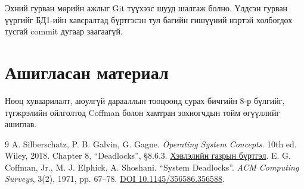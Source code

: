 Эхний гурван мөрийн ажлыг Git түүхээс шууд шалгаж болно. Үлдсэн гурван үүргийг БД1-ийн хавсралтад бүртгэсэн тул багийн гишүүний нэртэй холбогдох тусгай commit дугаар заагаагүй.
\newpage
\section*{Ашигласан материал}
Нөөц хуваарилалт, аюулгүй дарааллын тооцоонд сурах бичгийн 8-р бүлгийг, түгжрэлийн ойлголтод Coffman болон хамтран зохиогчдын тойм өгүүллийг ашиглав.
\begingroup
\renewcommand{\refname}{}
\begin{thebibliography}{9}
 A. Silberschatz, P. B. Galvin, G. Gagne. \textit{Operating System Concepts}. 10th ed. Wiley, 2018. Chapter 8, “Deadlocks”, §8.6.3. \href{https://www.wiley.com/en-us/operating-system-concepts-10th-edition-p-9781119320913}{Хэвлэлийн газрын бүртгэл}.
 E. G. Coffman, Jr., M. J. Elphick, A. Shoshani. “System Deadlocks”. \textit{ACM Computing Surveys}, 3(2), 1971, pp. 67–78. \href{https://doi.org/10.1145/356586.356588}{DOI 10.1145/356586.356588}.
\end{thebibliography}
\endgroup
